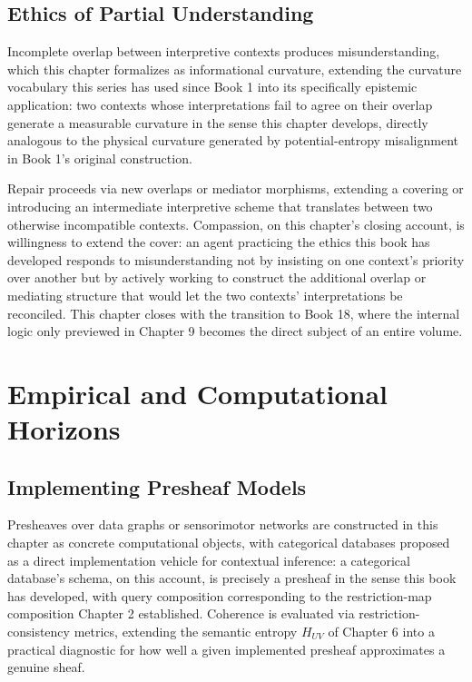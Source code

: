 \chapter{Ethics of Partial Understanding}

Incomplete overlap between interpretive contexts produces misunderstanding, which this chapter formalizes as informational curvature, extending the curvature vocabulary this series has used since Book 1 into its specifically epistemic application: two contexts whose interpretations fail to agree on their overlap generate a measurable curvature in the sense this chapter develops, directly analogous to the physical curvature generated by potential-entropy misalignment in Book 1's original construction.

Repair proceeds via new overlaps or mediator morphisms, extending a covering or introducing an intermediate interpretive scheme that translates between two otherwise incompatible contexts. Compassion, on this chapter's closing account, is willingness to extend the cover: an agent practicing the ethics this book has developed responds to misunderstanding not by insisting on one context's priority over another but by actively working to construct the additional overlap or mediating structure that would let the two contexts' interpretations be reconciled. This chapter closes with the transition to Book 18, where the internal logic only previewed in Chapter 9 becomes the direct subject of an entire volume.

\part{Empirical and Computational Horizons}

\chapter{Implementing Presheaf Models}

Presheaves over data graphs or sensorimotor networks are constructed in this chapter as concrete computational objects, with categorical databases proposed as a direct implementation vehicle for contextual inference: a categorical database's schema, on this account, is precisely a presheaf in the sense this book has developed, with query composition corresponding to the restriction-map composition Chapter 2 established. Coherence is evaluated via restriction-consistency metrics, extending the semantic entropy $H_{UV}$ of Chapter 6 into a practical diagnostic for how well a given implemented presheaf approximates a genuine sheaf.

